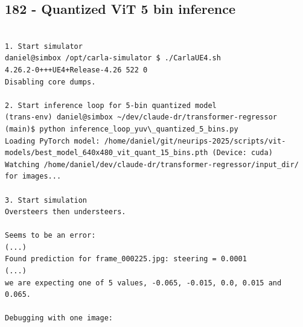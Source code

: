 \subsection{182 - Quantized ViT 5 bin inference}
\label{app_res:182}

\begin{verbatim}

1. Start simulator
daniel@simbox /opt/carla-simulator $ ./CarlaUE4.sh 
4.26.2-0+++UE4+Release-4.26 522 0
Disabling core dumps.

2. Start inference loop for 5-bin quantized model
(trans-env) daniel@simbox ~/dev/claude-dr/transformer-regressor (main)$ python inference_loop_yuv\_quantized_5_bins.py
Loading PyTorch model: /home/daniel/git/neurips-2025/scripts/vit-models/best_model_640x480_vit_quant_15_bins.pth (Device: cuda)
Watching /home/daniel/dev/claude-dr/transformer-regressor/input_dir/ for images...

3. Start simulation
Oversteers then understeers.

Seems to be an error: 
(...)
Found prediction for frame_000225.jpg: steering = 0.0001
(...)
we are expecting one of 5 values, -0.065, -0.015, 0.0, 0.015 and 0.065.

Debugging with one image:


\end{verbatim}

